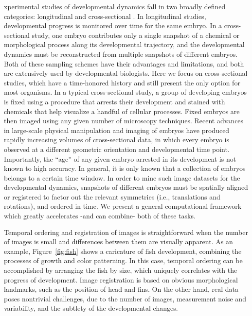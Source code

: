 \documentclass{pnastwo}
\begin{document}
\begin{article}
xperimental studies of developmental dynamics fall in two broadly defined categories: longitudinal and cross-sectional \cite{diggle2002analysis}.
%
In longitudinal studies, developmental progress is monitored over time for the same embryo.
%
In a cross-sectional study, one embryo contributes only a single snapshot of a chemical or morphological process along its developmental trajectory, and the developmental dynamics must be reconstructed from multiple snapshots of different embryos.
%
Both of these sampling schemes have their advantages and limitations, and both are extensively used by developmental biologists.
%
Here we focus on cross-sectional studies, which have a time-honored history and still present the only option for most organisms.
%
In a typical cross-sectional study, a group of developing embryos is fixed using a procedure that arrests their development and stained with chemicals that help visualize a handful of cellular processes.
%
Fixed embryos are then imaged using any given number of microscopy techniques.
%
Recent advances in large-scale physical manipulation and imaging of embryos have produced rapidly increasing volumes of cross-sectional data, in which every embryo is observed at a different geometric orientation and developmental time point.
%
Importantly, the ``age'' of any given embryo arrested in its development is not known to high accuracy.
%
In general, it is only known that a collection of embryos belongs to a certain time window.
%
In order to mine such image datasets for the developmental dynamics, snapshots of different embryos must be spatially aligned or registered to factor out the relevant symmetries (i.e., translations and rotations), and ordered in time.
%
We present a general computational framework which greatly accelerates -and can combine- both of these tasks.

Temporal ordering and registration of images is straightforward when the number of images is small and differences between them are visually apparent.
%
As an example, Figure~\ref{fig:fish} shows a caricature of fish development, combining the processes of growth and color patterning.
%
In this case, temporal ordering can be accomplished by arranging the fish by size, which uniquely correlates with the progress of development.
%
Image registration is based on obvious morphological landmarks, such as the position of head and fins.
%
On the other hand, real data poses nontrivial challenges, due to the number of images, measurement noise and variability, and the subtlety of the developmental changes.


\end{article}
\end{document}

